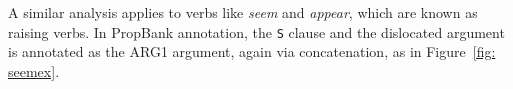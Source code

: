 \documentclass[11pt]{report}
\begin{document}
A similar analysis applies to verbs like \textit{seem} and \textit{appear}, which are known as raising verbs. In PropBank annotation, the \texttt{S} clause  and the dislocated argument is annotated as the ARG1 argument, again via concatenation, as in Figure~\ref{fig: seemex}.  

\begin{figure}[htbp]
\centering
{}

\end{figure}
\end{document}
